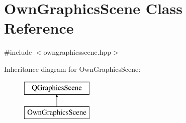\hypertarget{classOwnGraphicsScene}{}\section{Own\+Graphics\+Scene Class Reference}
\label{classOwnGraphicsScene}


{\ttfamily \#include $<$owngraphicsscene.\+hpp$>$}

Inheritance diagram for Own\+Graphics\+Scene\+:\begin{figure}[H]
\begin{center}
\leavevmode
\includegraphics[height=2.000000cm]{classOwnGraphicsScene}
\end{center}
\end{figure}
